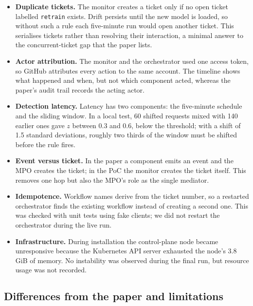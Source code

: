 \begin{itemize}
  \item \textbf{Duplicate tickets.} The monitor creates a ticket only if no open ticket labelled \texttt{retrain} exists. Drift persists until the new model is loaded, so without such a rule each five-minute run would open another ticket. This serialises tickets rather than resolving their interaction, a minimal answer to the concurrent-ticket gap that the paper lists.
  \item \textbf{Actor attribution.} The monitor and the orchestrator used one access token, so GitHub attributes every action to the same account. The timeline shows what happened and when, but not which component acted, whereas the paper's audit trail records the acting actor.
  \item \textbf{Detection latency.} Latency has two components: the five-minute schedule and the sliding window. In a local test, 60 shifted requests mixed with 140 earlier ones gave $z$ between 0.3 and 0.6, below the threshold; with a shift of 1.5 standard deviations, roughly two thirds of the window must be shifted before the rule fires.
  \item \textbf{Event versus ticket.} In the paper a component emits an event and the MPO creates the ticket; in the PoC the monitor creates the ticket itself. This removes one hop but also the MPO's role as the single mediator.
  \item \textbf{Idempotence.} Workflow names derive from the ticket number, so a restarted orchestrator finds the existing workflow instead of creating a second one. This was checked with unit tests using fake clients; we did not restart the orchestrator during the live run.
  \item \textbf{Infrastructure.} During installation the control-plane node became unresponsive because the Kubernetes API server exhausted the node's 3.8\,GiB of memory. No instability was observed during the final run, but resource usage was not recorded.
\end{itemize}

\subsection{Differences from the paper and limitations}
\label{sec:poc-diff}

